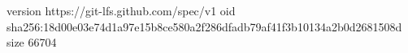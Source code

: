 version https://git-lfs.github.com/spec/v1
oid sha256:18d00e03e74d1a97e15b8ce580a2f286dfadb79af41f3b10134a2b0d2681508d
size 66704
